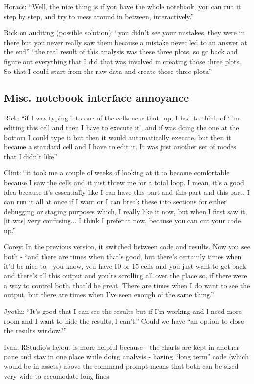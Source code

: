Horace: ``Well, the nice thing is if you have the whole notebook, you can run it step by step, and try to mess around in between, interactively.''

Rick on auditing (possible solution): ``you didn't see your mistakes, they were in there but you never really saw them because a mistake never led to an answer at the end'' ``the real result of this analysis was these three plots, so go back and figure out everything that I did that was involved in creating those three plots. So that I could start from the raw data and create those three plots.''


\subsection{Misc. notebook interface annoyance}
Rick: ``if I was typing into one of the cells near that top, I had to think of `I'm editing this cell and then I have to execute it', and if was doing the one at the bottom I could type it but then it would automatically execute, but then it became a standard cell and I have to edit it. It was just another set of modes that I didn't like''

Clint: ``it took me a couple of weeks of looking at it to become comfortable because I saw the cells and it just threw me for a total loop. I mean, it's a good idea because it's essentially like I can have this part and this part and this part. I can run it all at once if I want or I can break these into sections for either debugging or staging purposes which, I really like it now, but when I first saw it, [it was] very confusing... I think I prefer it now, because you can cut your code up.''

Corey: In the previous version, it switched between code and results. Now you see both - ``and there are times when that's good, but there's certainly times when it'd be nice to - you know, you have 10 or 15 cells and you just want to get back and there's all this output and you're scrolling all over the place so, if there were a way to control both, that'd be great. There are times when I do want to see the output, but there are times when I've seen enough of the same thing.''

Jyothi: ``It's good that I can see the results but if I'm working and I need more room and I want to hide the results, I can't.” Could we have “an option to close the results window?”

Ivan: RStudio's layout is more helpful because
- the charts are kept in another pane and stay in one place while doing analysis
- having ``long term'' code (which would be in assets) above the command prompt means that both can be sized very wide to accomodate long lines

